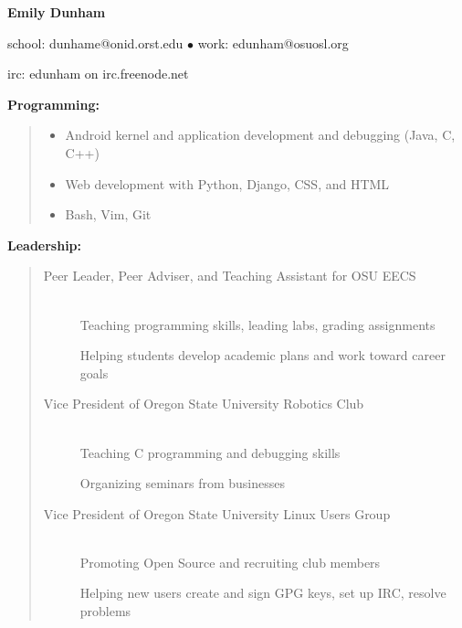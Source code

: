 \documentclass[11pt]{article}
\begin{document}
\centerline{{\LARGE \bf Emily Dunham}}

\smallskip

\centerline{{school: dunhame@onid.orst.edu $\bullet$ work:
edunham@osuosl.org}}
\centerline{{irc: edunham on irc.freenode.net}}

\hrulefill

\bigskip


\smallskip

{\large \bf Programming:}
\begin{quote}
\begin{itemize}
    \item Android kernel and application development and debugging (Java, C, C++)
    \item Web development with Python, Django, CSS, and HTML
    \item Bash, Vim, Git
\end{itemize}
\end{quote}

{\large \bf Leadership:}
\begin{quote}
\begin{description}
    \item[Peer Leader, Peer Adviser, and Teaching Assistant for OSU EECS]
        \hfill \\ 
        Teaching programming skills, leading labs, grading assignments
        
        Helping students develop academic plans and work toward career goals

    \item[Vice President of Oregon State University Robotics Club]
        \hfill \\
        Teaching C programming and debugging skills

        Organizing seminars from businesses

    \item[Vice President of Oregon State University Linux Users Group]
        \hfill \\
        Promoting Open Source and recruiting club members

        Helping new users create and sign GPG keys, set up IRC, resolve problems
\end{description}
\end{quote}

\hrulefill
\smallskip
\end{document}
